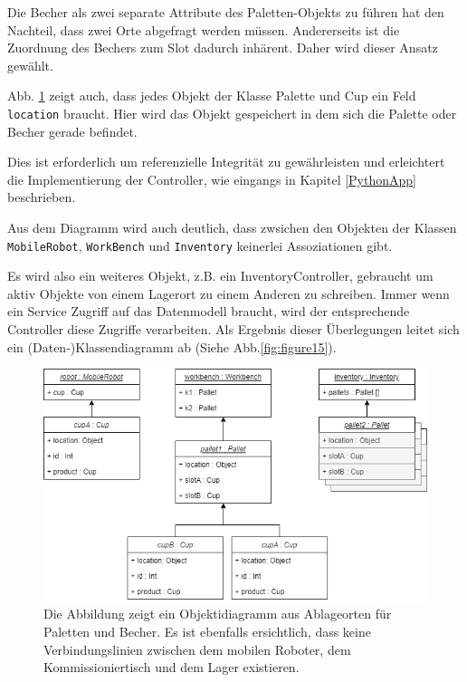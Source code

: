 Die Becher als zwei separate Attribute des Paletten-Objekts zu führen hat den Nachteil, dass zwei Orte abgefragt werden müssen.
Andererseits ist die Zuordnung des Bechers zum Slot dadurch inhärent.
Daher wird dieser Ansatz gewählt.

Abb. \ref{fig:figure14} zeigt auch, dass jedes Objekt der Klasse Palette und Cup ein Feld \verb|location| braucht.
Hier wird das Objekt gespeichert in dem sich die Palette oder Becher gerade befindet.

Dies ist erforderlich um referenzielle Integrität zu gewährleisten und erleichtert die Implementierung der Controller,
wie eingangs in Kapitel \ref{PythonApp} beschrieben.

Aus dem Diagramm wird auch deutlich, dass zwsichen den Objekten der Klassen \verb|MobileRobot|, \verb|WorkBench| und
\verb|Inventory| keinerlei Assoziationen gibt.

Es wird also ein weiteres Objekt, z.B. ein InventoryController, gebraucht um aktiv Objekte von einem Lagerort zu einem Anderen
zu schreiben.
Immer wenn ein Service Zugriff auf das Datenmodell braucht, wird der entsprechende Controller diese Zugriffe verarbeiten.
Als Ergebnis dieser Überlegungen leitet sich ein (Daten-)Klassendiagramm ab (Siehe Abb.\ref{fig:figure15}).

\begin{figure}
        \caption[Objektdiagramm]
        {\small Die Abbildung zeigt ein Objektidiagramm aus Ablageorten für Paletten und Becher. Es ist ebenfalls
        ersichtlich, dass keine Verbindungslinien zwischen dem mobilen Roboter, dem Kommissioniertisch und dem Lager existieren.
        }\label{fig:figure14}
        \includegraphics[width = \textwidth ]{Bilder/Objektdiagramm_PaletteCupStorage}
        \centering
\end{figure}

